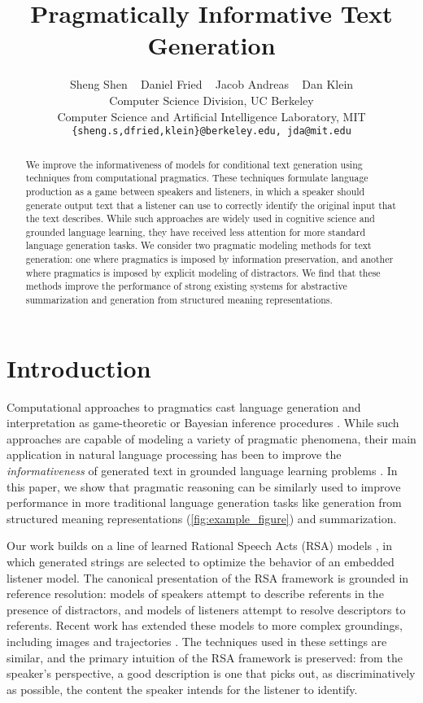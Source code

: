 \documentclass[11pt,a4paper]{article}
\title{Pragmatically Informative Text Generation}
\author{Sheng Shen ~ Daniel Fried ~ Jacob Andreas ~ Dan Klein \\
Computer Science Division, UC Berkeley\\ 
Computer Science and Artificial Intelligence Laboratory, MIT \\
{\tt \{sheng.s,dfried,klein\}@berkeley.edu, jda@mit.edu}  \\
}
\date{}
\begin{document}
\allowdisplaybreaks


\maketitle
\begin{abstract}
We improve the informativeness of models for conditional text generation using techniques from computational pragmatics. These techniques formulate language production as a game between speakers and listeners, in which a speaker should generate output text that a listener can use to correctly identify the original input that the text describes. While such approaches are widely used in cognitive science and grounded language learning, they have received less attention for more standard language generation tasks.  We consider two pragmatic modeling methods for text generation: one where pragmatics is imposed by information preservation, and another where pragmatics is imposed by explicit modeling of distractors. We find that these methods improve the performance of strong existing systems for abstractive summarization and generation from structured meaning representations.
%
 \end{abstract}


\section{Introduction}


Computational approaches to pragmatics cast
language generation and interpretation as game-theoretic or
Bayesian
inference procedures \cite{Golland10Game,frank2012predicting}.
While such approaches are capable of modeling a variety of pragmatic phenomena,
their main application in natural language processing has been to
improve the \emph{informativeness} of generated text in grounded language learning problems \cite{monroe2018bilingual}.
In this paper, we show that pragmatic reasoning can be similarly used to improve performance
in more traditional language generation tasks like generation
from structured meaning representations (\autoref{fig:example_figure})
and summarization.

Our work builds on a line of learned Rational Speech Acts (RSA) models
\cite{Monroe15RationalSpeech,Andreas16Pragmatics}, in which generated strings
are selected to optimize the behavior of an embedded listener model. The
canonical presentation of the RSA framework \cite{frank2012predicting} is
grounded in reference resolution: models of speakers attempt to describe
referents in the presence of distractors, and models of listeners attempt to
resolve descriptors to referents. Recent work has extended these models to more complex groundings, including images
\cite{Mao15Generation} and trajectories
\cite{fried2017unified}. The techniques used in these settings are similar, and
the primary intuition
of the RSA framework is preserved: from the speaker's perspective, a good
description is one that picks out, as discriminatively as possible, the content
the speaker intends for the listener to identify.
\end{document}
